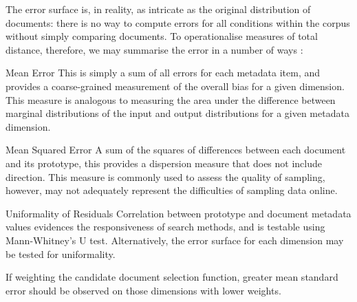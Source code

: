 The error surface is, in reality, as intricate as the original distribution of documents: there is no way to compute errors for all conditions within the corpus without simply comparing documents.  To operationalise measures of total distance, therefore, we may summarise the error in a number of ways :

\begin{itemizeTitle}

    \item[Mean Error] This is simply a sum of all errors for each metadata item, and provides a coarse-grained measurement of the overall bias for a given dimension.  This measure is analogous to measuring the area under the difference between marginal distributions of the input and output distributions for a given metadata dimension.

    \item[Mean Squared Error] A sum of the squares of differences between each document and its prototype, this provides a dispersion measure that does not include direction.  This measure is commonly used to assess the quality of sampling, however, may not adequately represent the difficulties of sampling data online.

    \item[Uniformality of Residuals] Correlation between prototype and document metadata values evidences the responsiveness of search methods, and is testable using Mann-Whitney's U test.  Alternatively, the error surface for each dimension may be tested for uniformality.

\end{itemizeTitle}



If weighting the candidate document selection function, greater mean standard error should be observed on those dimensions with lower weights.








